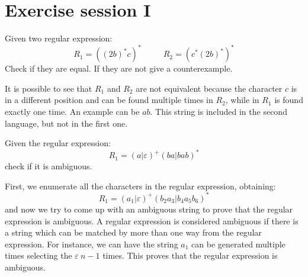 \documentclass[12pt, a4paper]{report}
\newtheorem[style=M,bodystyle=\normalfont]{theorem}{Theorem}
\newtheorem[style=M,bodystyle=\normalfont]{corollary}{Corollary}
\newtheorem[style=M,bodystyle=\normalfont]{lemma}{Lemma}
\newtheorem[style=M,bodystyle=\normalfont]{definition}{Definition}
\begin{document}
\newpage

\tableofcontents

\newpage

\chapter{Exercise session I}

\begin{Exercise}[label=1]
    Given two regular expression: 
    \[R_1=((2b)^{*}c)^* \:\:\:\:\:\:\:\:\:\:\:\: R_2=(c^*(2b)^{*})^*\]
    Check if they are equal. If they are not give a counterexample. 
\end{Exercise}
\begin{Answer}[ref=1]
    It is possible to see that $R_1$ and $R_2$ are not equivalent because the character $c$ is in a different position and can be found multiple times in $R_2$, while in $R_1$ is 
    found exactly one time. An example can be $ab$. This string is included in the second language, but not in the first one. 
\end{Answer}

\newpage 

\begin{Exercise}[label=2]
    Given the regular expression: 
    \[R_1=(a|\varepsilon)^{+}(ba|bab)^{*}\]
    check if it is ambiguous. 
\end{Exercise}
\begin{Answer}[ref=2]
    First, we enumerate all the characters in the regular expression, obtaining: 
    \[R_1=(a_1|\varepsilon)^{+}(b_2a_3|b_4a_5b_6)^{*}\]
    and now we try to come up with an ambiguous string to prove that the regular expression is ambiguous. 
    A regular expression is considered ambiguous if there is a string which can be matched by more than one way from the regular expression. 
    For instance, we can have the string $a_1$ can be generated multiple times selecting the $\varepsilon \: n - 1$ times. This proves that the regular expression is ambiguous. 
\end{Answer}

\newpage
\end{document}
